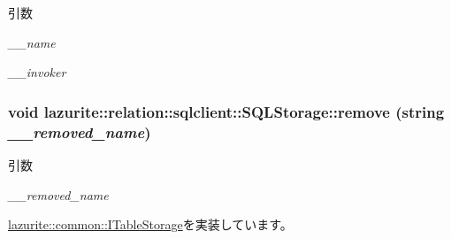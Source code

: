 \begin{DoxyParams}{引数}
\item[{\em \_\-\_\-name}]\item[{\em \_\-\_\-invoker}]\end{DoxyParams}
\hypertarget{classlazurite_1_1relation_1_1sqlclient_1_1_s_q_l_storage_a00e7725dfa5e9758202a22b6a8f816db}{
\subsubsection[{remove}]{\setlength{\rightskip}{0pt plus 5cm}void lazurite::relation::sqlclient::SQLStorage::remove (string {\em \_\-\_\-removed\_\-name})}}
\label{classlazurite_1_1relation_1_1sqlclient_1_1_s_q_l_storage_a00e7725dfa5e9758202a22b6a8f816db}

\begin{DoxyParams}{引数}
\item[{\em \_\-\_\-removed\_\-name}]\end{DoxyParams}


\hyperlink{interfacelazurite_1_1common_1_1_i_table_storage_abb90f2c62e425951cebd5cd5067a005a}{lazurite::common::ITableStorage}を実装しています。

